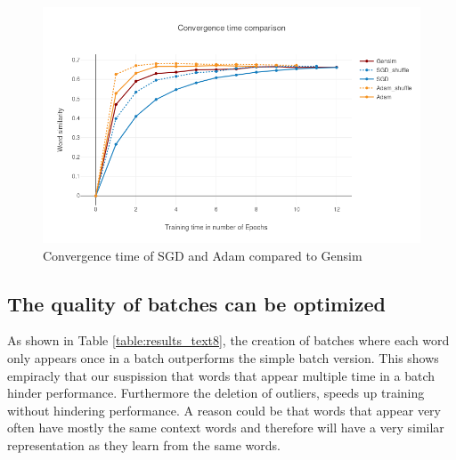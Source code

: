 \begin{figure}[h]
\centering
\includegraphics[scale=0.3]{images/gensim_vs_adam}
\caption{Convergence time of SGD and Adam compared to Gensim}
\label{fig:gensim_vs_adam}
\end{figure}

\subsection{The quality of batches can be optimized}
As shown in Table \ref{table:results_text8}, the creation of batches where each word only appears once in a batch outperforms the simple batch version. This shows empiracly that our suspission that words that appear multiple time in a batch hinder performance. Furthermore the deletion of outliers, speeds up training without hindering performance. A reason could be that words that appear very often have mostly the same context words and therefore will have a very similar representation as they learn from the same words. 

